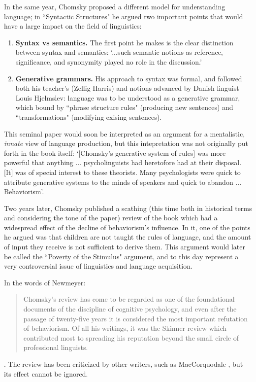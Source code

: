 \documentclass[../main.tex]{subfiles}
\begin{document}
In the same year, Chomsky proposed a different model for understanding language; in ``Syntactic Structures" he argued two important points that would have a large impact on the field of linguistics:
\begin{enumerate}
    \item \textbf{Syntax vs semantics.} The first point he makes is the clear distinction between syntax and semantics: \enquote*{...such semantic notions as reference, significance, and synonymity played no role in the discussion.}
    \item \textbf{Generative grammars.} His approach to syntax was formal, and followed both his teacher's (Zellig Harris) and notions advanced by Danish linguist Louis Hjelmslev: language was to be understood as a generative grammar, which bound by ``phrase structure rules" (producing new sentences) and ``transformations" (modifying exising sentences).
\end{enumerate}
This seminal paper would soon be interpreted as an argument for a mentalistic, \textit{innate} view of language production, but this intepretation was not originally put forth in the book itself: \enquote*{[Chomsky's generative system of rules] was more powerful that anything ... psycholinguists had heretofore had at their disposal. [It] was of special interest to these theorists. Many psychologists were quick to attribute generative systems to the minds of speakers and quick to abandon ... Behaviorism}\cite{steinbergPsycholinguisticsLanguageMind2013}.

Two years later, Chomsky published a scathing (this time both in historical terms and considering the tone of the paper) review \cite{chomskyReviewBFSkinner2013} of the book which had a widespread effect of the decline of behaviorism's influence. In it, one of the points he argued was that children are not taught the rules of language, and the amount of input they receive is not sufficient to derive them. This argument would later be called the ``Poverty of the Stimulus" argument, and to this day represent a very controversial issue of linguistics and language acquisition.

In the words of Newmeyer:
\begin{quote}
    Chomsky's review has come to be regarded as one of the foundational documents of the discipline of cognitive psychology, and even after the passage of twenty-five years it is considered the most important refutation of behaviorism. Of all his writings, it was the Skinner review which contributed most to spreading his reputation beyond the small circle of professional linguists.
\end{quote}\cite{newmeyerPoliticsLinguistics1986}. The review has been criticized by other writers, such as MacCorquodale \cite{maccorquodaleChomskyReviewSkinner1970}, but its effect cannot be ignored.
\end{document}
